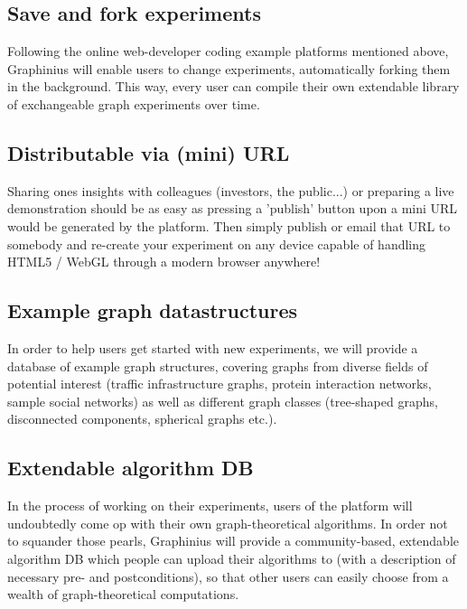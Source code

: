 	\subsection{Save and fork experiments}
	\label{ssect: save_fork_exps}
	
	Following the online web-developer coding example platforms mentioned above, Graphinius will enable users to change experiments, automatically forking them in the background. This way, every user can compile their own extendable library of exchangeable graph experiments over time.		
	
	\subsection{Distributable via (mini) URL}
	\label{ssect:distribute_url}
	
	Sharing ones insights with colleagues (investors, the public...) or preparing a live demonstration should be as easy as pressing a 'publish' button upon a mini URL would be generated by the platform. Then simply publish or email that URL to somebody and re-create your experiment on any device capable of handling HTML5 / WebGL through a modern browser anywhere!	
	
	\subsection{Example graph datastructures}
	\label{ssect:pre_settings}
	
	In order to help users get started with new experiments, we will provide a database of example graph structures, covering graphs from diverse fields of potential interest (traffic infrastructure graphs, protein interaction networks, sample social networks) as well as different graph classes (tree-shaped graphs, disconnected components, spherical graphs etc.).
	
	\subsection{Extendable algorithm DB}
	\label{ssect:ext_algo_db}
	In the process of working on their experiments, users of the platform will undoubtedly come op with their own graph-theoretical algorithms. In order not to squander those pearls, Graphinius will provide a community-based, extendable algorithm DB which people can upload their algorithms to (with a description of necessary pre- and postconditions), so that other users can easily choose from a wealth of graph-theoretical computations.


